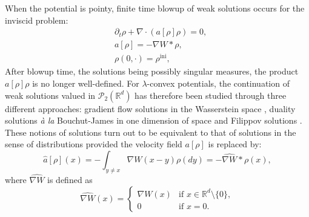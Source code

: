 \documentclass[JEP,XML,SOM,Unicode, NoFloatCountersInSection,published]{cedram}
\newcommand{\ini}{\mathrm{ini}}
\def\RR{\mathbb{R}}
\def\pa{\partial}
\def\calP{{\mathcal P}}
\def\achapo{\widehat{a}}
\def\nabWchapo{\widehat{\nabla W}}
\theoremstyle{plain}
\theoremstyle{definition}
\begin{document}
When the potential is pointy, finite time blowup of weak solutions occurs \cite{BertozziBrandman, bertozzi09} for the inviscid problem:
\begin{subequations}\label{eq:agg}
\begin{align}
& \pa_t \rho + \nabla \cdot (a[\rho] \rho) = 0, \label{eq:rho} \\
& a[\rho] = - \nabla W * \rho, \label{eq:arho} \\
& \rho(0, \cdot) = \rho^{\ini}, \label{eq:rho0}
\end{align}
\end{subequations}
After blowup time, the solutions being possibly singular measures, the product $a[\rho] \rho$ is no longer well-defined. For $\lambda$-convex potentials, the continuation of weak solutions valued in $\calP_2(\RR^d)$ has therefore been studied through three different approaches: gradient flow solutions in the Wasserstein space \cite{figalli11}, duality solutions \textit{à la} Bouchut-James \cite{GF_dual_jv, JVChemotaxis} in one dimension of space and Filippov solutions \cite{cjlv15, lv17}. These notions of solutions turn out to be equivalent to that of solutions in the sense of distributions provided the velocity field $a[\rho]$ is replaced by:
\begin{equation}\label{eq:achapo}
\achapo[\rho](x) = -\int_{y \neq x} \nabla W(x-y) \rho(dy) = -\nabWchapo * \rho (x),
\end{equation}
where $\nabWchapo$ is defined as
\begin{equation*}%
\nabWchapo(x) = 
\begin{cases}
\nabla W(x) &\text{if } x \in \RR^d \setminus \{0\}, \\
0 &\text{if } x = 0.
\end{cases}
\end{equation*}
\end{document}
